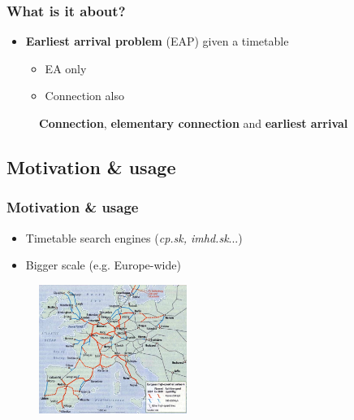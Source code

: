 \documentclass[]{beamer}
\newcommand{\inputTikZ}[1]{%
  }
\newcommand{\inputTikZ}[1]{%
    \beginpgfgraphicnamed{#1-external}%
    \endpgfgraphicnamed%
  }
\begin{document}
	    \begin{frame}
	        \frametitle{What is it about?}
	        \begin{itemize}
	            \item \textbf{Earliest arrival problem} (EAP) given a timetable
	            \begin{itemize}
	            	\item EA only
	            	\item Connection also
	            \end{itemize}
	        \end{itemize}
	        \begin{figure}[h!]
				\scriptsize
                \begin{center}
					\inputTikZ{./tikzpics/connection}
                \end{center}
                \caption{\textbf{Connection}, \textbf{elementary connection} and \textbf{earliest arrival}}
            \end{figure}
	    \end{frame}

        \subsection{Motivation \& usage}
        \begin{frame}
            \frametitle{Motivation \& usage}
            \begin{itemize}
                \item Timetable search engines (\emph{cp.sk, imhd.sk}...)
	            \item Bigger scale (e.g. Europe-wide)
            \end{itemize}
            \begin{figure}[h!]
	            \includegraphics[height=1.65in]{europerails.jpg}
        	\end{figure}
        \end{frame}
        
\end{document}

